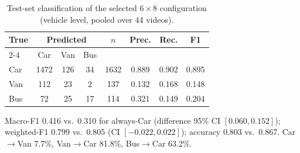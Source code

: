 \documentclass[conference]{IEEEtran}
\begin{document}
\begin{table}[t]
\centering
\caption{Test-set classification of the selected $6{\times}8$
configuration (vehicle level, pooled over 44 videos).}
\label{tab:cls}
\scriptsize
\setlength{\tabcolsep}{3.2pt}
\begin{tabular}{lccccccc}
\toprule
\textbf{True} & \multicolumn{3}{c}{\textbf{Predicted}} & \textbf{$n$} & \textbf{Prec.} & \textbf{Rec.} & \textbf{F1}\\
\cmidrule(lr){2-4}
 & Car & Van & Bus & & & & \\
\midrule
Car & 1472 & 126 & 34 & 1632 & 0.889 & 0.902 & 0.895\\
Van & 112 & 23 & 2 & 137 & 0.132 & 0.168 & 0.148\\
Bus & 72 & 25 & 17 & 114 & 0.321 & 0.149 & 0.204\\
\bottomrule
\end{tabular}

\smallskip
\parbox{\columnwidth}{\scriptsize Macro-F1 0.416 vs.\ 0.310 for
always-Car (difference 95\% CI $[0.060, 0.152]$); weighted-F1 0.799 vs.\
0.805 (CI $[-0.022, 0.022]$); accuracy 0.803 vs.\ 0.867. Car$\to$Van
7.7\%, Van$\to$Car 81.8\%, Bus$\to$Car 63.2\%.}
\end{table}
\end{document}
